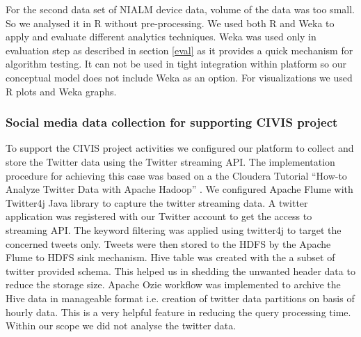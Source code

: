  For the second data set of NIALM device data, volume of the data was too small. So we analysed it in R without pre-processing. We used both R and Weka to apply and evaluate different analytics techniques. Weka was used only in evaluation step as described in section \ref{eval} as it provides a quick mechanism for algorithm testing. It can not be used in tight integration within platform so our conceptual model does not include Weka as an option. For visualizations we used R plots and Weka graphs.
 
 \subsubsection{Social media data collection for supporting CIVIS project}
 To support the CIVIS project activities we configured our platform to collect and store the Twitter data using the Twitter streaming API. The implementation procedure for achieving this case was based on a the Cloudera Tutorial ``How-to Analyze Twitter Data with Apache Hadoop'' \cite{clouderatwitter}.
 We configured Apache Flume with Twitter4j Java library to  capture the twitter streaming data. A twitter application was registered with our Twitter account to get the access to streaming API. The keyword filtering was applied using twitter4j to target the concerned tweets only. Tweets were then stored to the HDFS by the Apache Flume to HDFS sink mechanism. Hive table was created with the a subset of twitter provided schema. This helped us in shedding the unwanted header data to reduce the storage size. Apache Ozie workflow was implemented to archive the Hive data in manageable format i.e. creation of twitter data partitions on basis of hourly data. This is a very helpful feature in reducing the query processing time. Within our scope we did not analyse the twitter data.    
